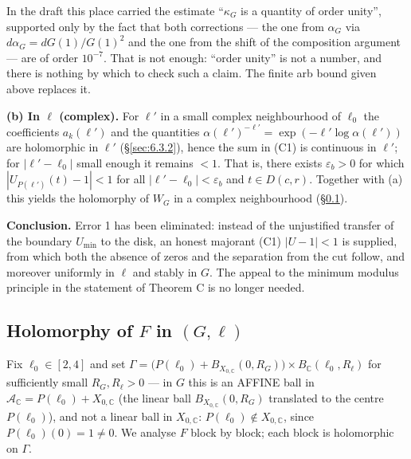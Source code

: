 In the draft this place carried the estimate ``$\kappa_G$ is a quantity of
order unity'', supported only by the fact that both corrections --- the one
from $\alpha_G$ via $d\alpha_G=dG(1)/G(1)^2$ and the one from the shift of
the composition argument --- are of order $10^{-7}$. That is not enough:
``order unity'' is not a number, and there is nothing by which to check such
a claim. The finite arb bound given above replaces it.

\textbf{(b) In $\ell$ (complex).} For $\ell'$ in a small complex
neighbourhood of $\ell_0$ the coefficients $a_k(\ell')$ and the quantities
$\alpha(\ell')^{-\ell'}=\exp(-\ell'\log\alpha(\ell'))$ are holomorphic in
$\ell'$ (\S\ref{sec:6.3.2}), hence the sum in (C1) is continuous in $\ell'$; for
$|\ell'-\ell_0|$ small enough it remains $<1$. That is, there exists
$\varepsilon_b>0$ for which $|U_{P(\ell')}(t)-1|<1$ for all
$|\ell'-\ell_0|<\varepsilon_b$ and $t\in D(c,r)$. Together with (a) this
yields the holomorphy of $W_G$ in a complex neighbourhood (\S\ref{sec:6.5}).

\textbf{Conclusion.} Error 1 has been eliminated: instead of the unjustified
transfer of the boundary $U_{\min}$ to the disk, an honest majorant (C1)
$|U-1|<1$ is supplied, from which both the absence of zeros and the
separation from the cut follow, and moreover uniformly in $\ell$ and stably
in $G$. The appeal to the minimum modulus principle in the statement of
Theorem C is no longer needed.



\subsection{Holomorphy of $F$ in $(G,\ell)$}
\label{sec:6.5}

Fix $\ell_0\in[2,4]$ and set
$\Gamma=\bigl(P(\ell_0)+B_{X_{0,\mathbb C}}(0,R_G)\bigr)\times B_{\mathbb C}(\ell_0,R_\ell)$
for sufficiently small $R_G,R_\ell>0$ --- in $G$ this is an AFFINE ball in
$\mathcal A_{\mathbb C}=P(\ell_0)+X_{0,\mathbb C}$ (the linear ball
$B_{X_{0,\mathbb C}}(0,R_G)$ translated to the centre $P(\ell_0)$), and not a
linear ball in $X_{0,\mathbb C}$: $P(\ell_0)\notin X_{0,\mathbb C}$, since
$P(\ell_0)(0)=1\neq0$. We analyse $F$ block by block; each block is holomorphic
on $\Gamma$.

